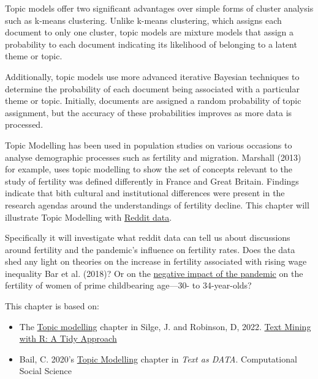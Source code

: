 \documentclass[
  letterpaper,
  DIV=11,
  numbers=noendperiod]{scrreprt}
\begin{document}
Topic models offer two significant advantages over simple forms of
cluster analysis such as k-means clustering. Unlike k-means clustering,
which assigns each document to only one cluster, topic models are
mixture models that assign a probability to each document indicating its
likelihood of belonging to a latent theme or topic.

Additionally, topic models use more advanced iterative Bayesian
techniques to determine the probability of each document being
associated with a particular theme or topic. Initially, documents are
assigned a random probability of topic assignment, but the accuracy of
these probabilities improves as more data is processed.

Topic Modelling has been used in population studies on various occasions
to analyse demographic processes such as fertility and migration.
Marshall (2013) for example, uses topic modelling to show the set of
concepts relevant to the study of fertility was defined differently in
France and Great Britain. Findings indicate that bith cultural and
institutional differences were present in the research agendas around
the understandings of fertility decline. This chapter will illustrate
Topic Modelling with
\href{https://www.reddit.com/r/unitedkingdom/}{Reddit data}.

Specifically it will investigate what reddit data can tell us about
discussions around fertility and the pandemic's influence on fertility
rates. Does the data shed any light on theories on the increase in
fertility associated with rising wage inequality Bar et al. (2018)? Or
on the
\href{https://www.stlouisfed.org/on-the-economy/2021/november/pandemic-influence-us-fertility-rates}{negative
impact of the pandemic} on the fertility of women of prime childbearing
age---30- to 34-year-olds?

This chapter is based on:

\begin{itemize}
\item
  The \href{https://www.tidytextmining.com/topicmodeling.html}{Topic
  modelling} chapter in Silge, J. and Robinson, D, 2022.
  \href{https://www.tidytextmining.com/}{Text Mining with R: A Tidy
  Approach}
\item
  Bail, C. 2020's
  \href{https://sicss.io/2020/materials/day3-text-analysis/topic-modeling/rmarkdown/Topic_Modeling.html}{Topic
  Modelling} chapter in \emph{Text as DATA}. Computational Social
  Science
\end{itemize}
\end{document}
